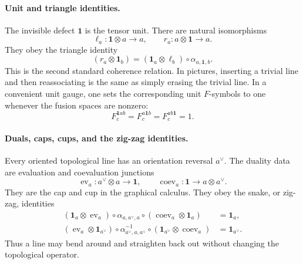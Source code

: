 \documentclass[11pt]{article}
\newcommand{\id}{\mathbf{1}}
\begin{document}
\paragraph{Unit and triangle identities.}
The invisible defect $\id$ is the tensor unit.  There are natural isomorphisms
\begin{equation}
  \ell_a:\id\otimes a\to a,
  \qquad
  r_a:a\otimes\id\to a .
\end{equation}
They obey the triangle identity
\begin{equation}
  (r_a\otimes \id_b)
  =
  (\id_a\otimes \ell_b)\circ \alpha_{a,\id,b} .
  \label{eq:triangleidentity}
\end{equation}
This is the second standard coherence relation.  In pictures, inserting a trivial line and then reassociating is the same as simply erasing the trivial line.  In a convenient unit gauge, one sets the corresponding unit $F$-symbols to one whenever the fusion spaces are nonzero:
\begin{equation}
  F^{\id a b}_{c}=F^{a\id b}_{c}=F^{a b\id}_{c}=1 .
\end{equation}

\paragraph{Duals, caps, cups, and the zig-zag identities.}
Every oriented topological line has an orientation reversal $a^\vee$.  The duality data are evaluation and coevaluation junctions
\begin{equation}
  \operatorname{ev}_a:a^\vee\otimes a\to\id,
  \qquad
  \operatorname{coev}_a:\id\to a\otimes a^\vee .
\end{equation}
They are the cap and cup in the graphical calculus.  They obey the snake, or zig-zag, identities
\begin{equation}
\begin{aligned}
  (\id_a\otimes \operatorname{ev}_a)\circ
  \alpha_{a,a^\vee,a}\circ
  (\operatorname{coev}_a\otimes \id_a)&=\id_a,\\
  (\operatorname{ev}_a\otimes \id_{a^\vee})\circ
  \alpha^{-1}_{a^\vee,a,a^\vee}\circ
  (\id_{a^\vee}\otimes \operatorname{coev}_a)&=\id_{a^\vee} .
\end{aligned}
\label{eq:zigzag}
\end{equation}
Thus a line may bend around and straighten back out without changing the topological operator.
\end{document}
